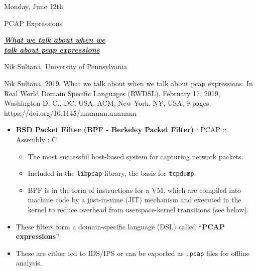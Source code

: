 \documentclass[11pt]{article}
\begin{document}
\begin{shininggoldbox}{Monday, June 12th\vspace{-2.2em}\begin{flushright}\large PCAP Expressions \end{flushright}}
    \begin{multicols}{2}
        \Large\textbf{\textit{\underline{What we talk about when we}}} \\ 
        \Large\textbf{\textit{\underline{talk about pcap expressions}}}
        \bigskip
        
        \normalsize Nik Sultana, University of Pennsylvania
        \columnbreak
        \begin{mdframed}
        \tiny Nik Sultana. 2019. What we talk about when we talk about pcap expressions. In Real World Domain Specific Languages (RWDSL), February 17, 2019, Washington D. C., DC, USA. ACM, New York, NY, USA, 9 pages. \\ https://doi.org/10.1145/nnnnnnn.nnnnnnn
        \end{mdframed}
        \vspace{-2em}
    \end{multicols}
    \vspace{-2em}
    \textbf{\hline}
    \begin{itemize}
        \item\textbf{BSD Packet Filter (BPF - Berkeley Packet Filter)} : PCAP :: Assembly : C
        \vspace{-0.5em}
        \begin{itemize}
            \item The most successful host-based system for capturing network packets.
            \item Included in the \texttt{libpcap} library, the basis for \texttt{tcpdump}.
            \item BPF is in the form of instructions for a VM, which are compiled into machine code by a just-in-time (JIT) mechanism and executed in the kernel to reduce overhead from userspace-kernel transitions (see below).
        \end{itemize}
        \vspace{-0.75em}
        \item These filters form a domain-specific language (DSL) called ``\textbf{PCAP expressions}''.
        \vspace{-0.75em}
        \item These are either fed to IDS/IPS or can be exported as \texttt{.pcap} files for offline analysis.

\end{itemize}
\end{shininggoldbox}
\end{document}
